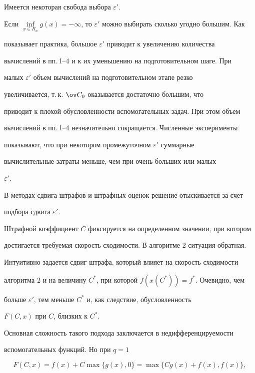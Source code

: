 Имеется некоторая свобода выбора $\varepsilon'$.


Если $\inf\limits_{x\in R_n}g(x)=


-\infty$, то $\varepsilon'$ можно выбирать сколько угодно большим. Как 


показывает практика, большое $\varepsilon'$ приводит к увеличению количества 


вычислений в пп.\,1--4 и к их уменьшению на подготовительном шаге. При


малых $\varepsilon'$ объем вычислений на подготовительном этапе резко 


увеличивается, т.\,к. $\ov C_0$ оказывается достаточно большим, что


приводит к плохой обусловленности вспомогательных задач. При этом объем 


вычислений в пп.\,1--4 незначительно сокращается. Численные эксперименты 


показывают, что при некотором промежуточном $\varepsilon'$ суммарные 


вычислительные затраты меньше, чем при очень больших или малых


$\varepsilon'$.





В методах сдвига штрафов и штрафных оценок решение отыскивается за счет 


подбора сдвига $\varepsilon'$.


Штрафной коэффициент $C$ фиксируется на определенном значении, при котором 


достигается требуемая скорость сходимости. В алгоритме 2 ситуация обратная.


Интуитивно задается сдвиг штрафа, который влияет на скорость сходимости 


алгоритма 2 и на величину $C^*$, при которой $f(x(C^*))=f^*$. Очевидно, чем 


больше $\varepsilon'$, тем меньше $C^*$ и, как следствие, обусловленность


$F(C,x)$ при $C$, близких к $C^*$. 





Основная сложность такого подхода заключается в недифференцируемости 


вспомогательных функций. Но при $q=1$


\begin{equation}\label{to}


F(C,x)=f(x)+C\max\{g(x),0\}=\max\{Cg(x)+f(x),f(x)\},


\end{equation}


